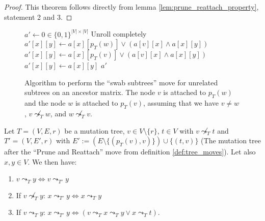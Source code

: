 \begin{proof}
    This theorem follows directly from lemma \ref{lem:prune_reattach_property}, statement 2 and 3.    
\end{proof}

\begin{figure}[p]
    \begin{algorithmic}[1]
        \State $a' \leftarrow 0 \in \{0,1\}^{|V| \times |V|}$
             \Comment Unroll completely
                    \State $a'[x][y] \leftarrow a[x][p_T(w)] \vee (a[v][x] \wedge a[x][y])$
                    \State $a'[x][y] \leftarrow a[x][p_T(v)] \vee (a[v][x] \wedge a[x][y])$
                \Else
                    \State $a'[x][y] \leftarrow a[x][y]$
                \EndIf
            \EndFor
        \EndFor
        \State \Return $a'$
        \EndFunction
    \end{algorithmic}
    \caption{Algorithm to perform the ``swab subtrees'' move for unrelated subtrees on an ancestor matrix. The node $v$ is attached to $p_T(w)$ and the node $w$ is attached to $p_T(v)$, assuming that we have $v \neq w$, $v \not\leadsto_T w$, and $w \not\leadsto_T v$.}
    \label{alg:am_swap_unrelated}
\end{figure}

\begin{lemma}
    \label{lem:prune_reattach_property}
    Let $T = (V, E, r)$ be a mutation tree, $v \in V \setminus \{r\}$, $t \in V$ with $v \not\leadsto_T t$ and $T' = (V, E', r)$ with $E' := (E \setminus \{(p_T(v), v)\}) \cup \{(t, v)\}$ (The mutation tree after the ``Prune and Reattach'' move from definition \ref{def:tree_moves}). Let also $x, y \in V$. We then have:
    \begin{enumerate}
        \item $v \leadsto_T y \Leftrightarrow v \leadsto_{T'} y$
        \item If $v \not\leadsto_T y$: $x \leadsto_{T'} y \Leftrightarrow x \leadsto_T y$
        \item If $v \leadsto_T y$: $x \leadsto_{T'} y \Leftrightarrow (v \leadsto_T x \leadsto_T y \vee x \leadsto_T t)$.
    \end{enumerate}
\end{lemma}


